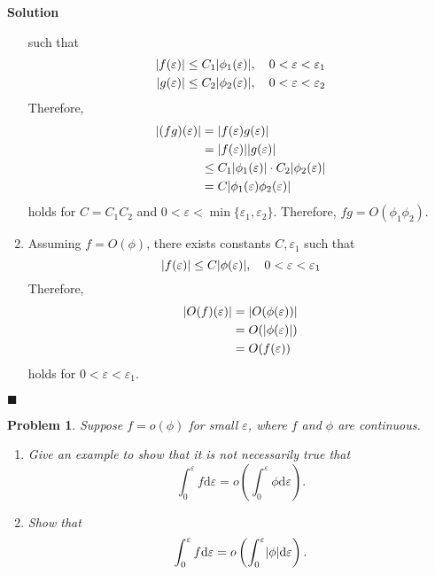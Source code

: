 \documentclass[11pt]{article}
\newcommand{\vep}{\varepsilon}
\DeclarePairedDelimiter\abs{\lvert}{\rvert}
\theoremstyle{problemstyle}
\newtheorem{problem}{Problem}
\newenvironment{solution}
  {\noindent\textbf{Solution}\quad}
  {\hfill$\blacksquare$\par\vspace{1em}}
\begin{document}
\begin{solution}
\begin{enumerate}
      such that
      \begin{align*}
        \abs{f(\vep)} & \leq C_1 \abs{\phi_1(\vep)}, \quad 0 < \vep < \vep_1 \\
        \abs{g(\vep)} & \leq C_2 \abs{\phi_2(\vep)}, \quad 0 < \vep < \vep_2
      \end{align*}
      Therefore,
      \begin{align*}
        \abs{(fg)(\vep)} 
          & = \abs{f(\vep)g(\vep)} \\
          & = \abs{f(\vep)}\abs{g(\vep)} \\
          & \leq C_1 \abs{\phi_1(\vep)} \cdot C_2 \abs{\phi_2(\vep)} \\
          & = C \abs{\phi_1(\vep)\phi_2(\vep)} \\
      \end{align*}
      holds for $C = C_1 C_2$ and $0 < \vep < \min\{\vep_1, \vep_2\}$.
      Therefore, $fg = O(\phi_1\phi_2)$.
    \item Assuming $f = O(\phi)$, there exists constants $C,\vep_1$ such that
      \[ \abs{f(\vep)} \leq C \abs{\phi(\vep)}, \quad 0 < \vep < \vep_1 \]
      Therefore,
      \begin{align*}
        \abs{O(f)(\vep)} 
          & = \abs{O(\phi(\vep))} \\
          & = O(\abs{\phi(\vep)}) \\
          & = O(f(\vep)) \\
      \end{align*}
      holds for $0 < \vep < \vep_1$.
  \end{enumerate} 
\end{solution}
 
\newpage
\begin{problem}{1.5}
Suppose $f=o(\phi)$ for small $\vep$, where $f$ and $\phi$ are continuous.
\begin{enumerate}
  \item Give an example to show that it is not necessarily true that
    \[ \int_0^\vep f \mathrm{d} \vep = o\left(\int_0^\vep \phi \mathrm{d}
    \vep \right).\]
  \item Show that 
    \[ \int_0^\vep f \mathrm{d} \vep = o\left(\int_0^\vep \abs{\phi}
    \mathrm{d} \vep \right).\]
\end{enumerate}
\end{problem}
   
\end{document}
